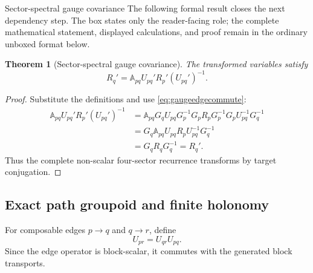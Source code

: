 \documentclass[11pt]{article}
\numberwithin{equation}{section}
\newtheorem{theorem}[definition]{Theorem}
\theoremstyle{remark}
\begin{document}
\begin{proofguide}{Sector-spectral gauge covariance}
The following formal result closes the next dependency step. The box states only the reader-facing role; the complete mathematical statement, displayed calculations, and proof remain in the ordinary unboxed format below.
\end{proofguide}
\begin{theorem}[Sector-spectral gauge covariance]
The transformed variables satisfy
\begin{equation}
R_q'=\mathbb A_{pq}U_{pq}'R_p'(U_{pq}')^{-1}.
\label{eq:fullgaugecovariance}
\end{equation}
\end{theorem}
\begin{proof}
Substitute the definitions and use \eqref{eq:gaugeedgecommute}:
\begin{align}
\mathbb A_{pq}U_{pq}'R_p'(U_{pq}')^{-1}
&=\mathbb A_{pq}G_qU_{pq}G_p^{-1}G_pR_pG_p^{-1}G_pU_{pq}^{-1}G_q^{-1}\\
&=G_q\mathbb A_{pq}U_{pq}R_pU_{pq}^{-1}G_q^{-1}\\
&=G_qR_qG_q^{-1}=R_q'.
\end{align}
Thus the complete non-scalar four-sector recurrence transforms by target conjugation.
\end{proof}

\subsection{Exact path groupoid and finite holonomy}
For composable edges $p\to q$ and $q\to r$, define
\begin{equation}
U_{pr}=U_{qr}U_{pq}.
\label{eq:transportcomposition}
\end{equation}
Since the edge operator is block-scalar, it commutes with the generated block transports.
\end{document}
